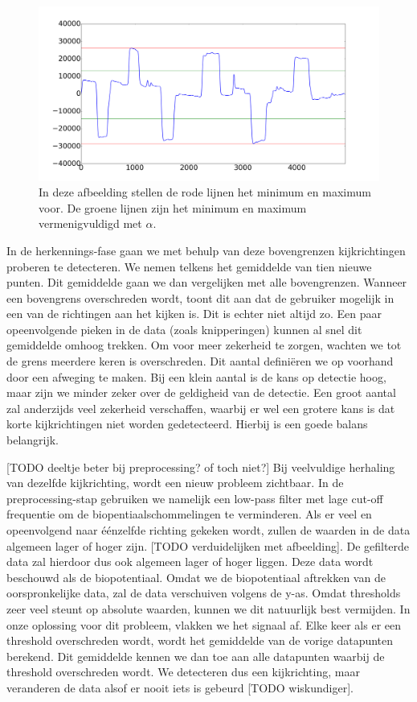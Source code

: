 \documentclass{article}
\begin{document}
\begin{figure}[h]
\centering
\includegraphics[width=\linewidth]{images/thresholds_distribution}
\caption{In deze afbeelding stellen de rode lijnen het minimum en maximum voor. De groene lijnen zijn het minimum en maximum vermenigvuldigd met $\alpha$.}
\end{figure}

In de herkennings-fase gaan we met behulp van deze bovengrenzen kijkrichtingen proberen te detecteren. We nemen telkens het gemiddelde van tien nieuwe punten. Dit gemiddelde gaan we dan vergelijken met alle bovengrenzen. Wanneer een bovengrens overschreden wordt, toont dit aan dat de gebruiker mogelijk in een van de richtingen aan het kijken is. Dit is echter niet altijd zo. Een paar opeenvolgende pieken in de data (zoals knipperingen) kunnen al snel dit gemiddelde omhoog trekken. Om voor meer zekerheid te zorgen, wachten we tot de grens meerdere keren is overschreden. Dit aantal definiëren we op voorhand door een afweging te maken. Bij een klein aantal is de kans op detectie hoog, maar zijn we minder zeker over de geldigheid van de detectie. Een groot aantal zal anderzijds veel zekerheid verschaffen, waarbij er wel een grotere kans is dat korte kijkrichtingen niet worden gedetecteerd. Hierbij is een goede balans belangrijk.

[TODO deeltje beter bij preprocessing? of toch niet?]
Bij veelvuldige herhaling van dezelfde kijkrichting, wordt een nieuw probleem zichtbaar. In de preprocessing-stap gebruiken we namelijk een low-pass filter met lage cut-off frequentie om de biopentiaalschommelingen te verminderen. Als er veel en opeenvolgend naar éénzelfde richting gekeken wordt, zullen de waarden in de data algemeen lager of hoger zijn. [TODO verduidelijken met afbeelding]. De gefilterde data zal hierdoor dus ook algemeen lager of hoger liggen. Deze data wordt beschouwd als de biopotentiaal. Omdat we de biopotentiaal aftrekken van de oorspronkelijke data, zal de data verschuiven volgens de y-as. Omdat thresholds zeer veel steunt op absolute waarden, kunnen we dit natuurlijk best vermijden. In onze oplossing voor dit probleem, vlakken we het signaal af. Elke keer als er een threshold overschreden wordt, wordt het gemiddelde van de vorige datapunten berekend. Dit gemiddelde kennen we dan toe aan alle datapunten waarbij de threshold overschreden wordt. We detecteren dus een kijkrichting, maar veranderen de data alsof er nooit iets is gebeurd [TODO wiskundiger].
\end{document}
